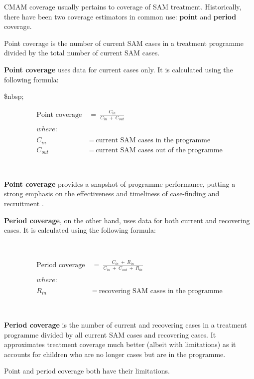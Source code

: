 \documentclass[12pt,a4paper]{book}
\theoremstyle{definition}
\theoremstyle{definition}
\theoremstyle{definition}
\theoremstyle{remark}
\begin{document}
CMAM coverage usually pertains to coverage of SAM treatment.
Historically, there have been two coverage estimators in common use:
\textbf{point} and \textbf{period} coverage.

Point coverage is the number of current SAM cases in a treatment
programme divided by the total number of current SAM cases.

\textbf{Point coverage} uses data for current cases only. It is
calculated using the following formula:

\$nbsp;

\[\begin{aligned} 
\text{Point coverage} & ~ = ~ \frac{C_{in}}{C_{in} ~ + ~ C_{out}} \\
\\
where: & \\
\\
C_{in} & ~ = ~ \text{current SAM cases in the programme} \\
C_{out} & ~ = ~ \text{current SAM cases out of the programme}
\end{aligned}\]

~

\textbf{Point coverage} provides a snapshot of programme performance,
putting a strong emphasis on the effectiveness and timeliness of
case-finding and recruitment \citep{Myatt:2012tt}.

\textbf{Period coverage}, on the other hand, uses data for both current
and recovering cases. It is calculated using the following formula:

~

\[\begin{aligned}
\text{Period coverage} & ~ = ~ \frac{C_{in} ~ + ~ R_{in}}{C_{in} ~ + ~ C_{out} ~ + ~ R_{in}} \\
\\
where: & \\
\\
R_{in} & ~ = ~ \text{recovering SAM cases in the programme}
\end{aligned}\]

~

\textbf{Period coverage} is the number of current and recovering cases
in a treatment programme divided by all current SAM cases and recovering
cases. It approximates treatment coverage much better (albeit with
limitations) as it accounts for children who are no longer cases but are
in the programme.

Point and period coverage both have their limitations.
\end{document}
